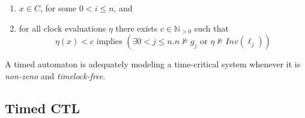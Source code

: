 \documentclass[a4paper, 10pt]{article}
\begin{document}
\begin{mdframed}
\begin{itemize}
    \begin{enumerate}
        \item $x\in C$, for some $0<i\leq n$, and
        \item for all clock evaluations $\eta$ there exists $c\in\mathds{N}_{>0}$ such that \[ \eta(x)<c \text{ implies } (\exists0<j\leq n.n\not\models g_j \text{ or } \eta\not\models Inv(\ell_j)) \]
    \end{enumerate}
\end{itemize}
A timed automaton is adequately modeling a time-critical system whenever it is \emph{non-zeno} and \emph{timelock-free}.
\end{mdframed}

\subsection{Timed CTL}
\end{document}
